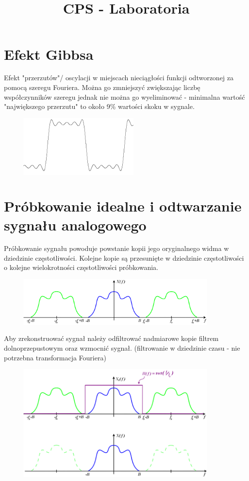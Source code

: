 \documentclass[11pt]{article}
\title{CPS - Laboratoria}
\begin{document}
\maketitle

\section{Efekt Gibbsa}
Efekt "przerzutów"/ oscylacji w miejscach nieciągłości funkcji odtworzonej za pomocą szeregu Fouriera. Można go zmniejszyć zwiększając liczbę współczynników szeregu jednak nie można go wyeliminować - minimalna wartość "największego przerzutu" to około 9\% wartości skoku w sygnale. 

\begin{figure}[h]
    \centering
    \includegraphics[width=6cm]{gibbs.png}
\end{figure}

\section{Próbkowanie idealne i odtwarzanie sygnału analogowego}
Próbkowanie sygnału powoduje powstanie kopii jego oryginalnego widma w dziedzinie częstotliwości. Kolejne kopie są przesunięte w dziedzinie częstotliwości o kolejne wielokrotności częstotliwości próbkowania.
\begin{figure}[h]
    \centering
    \includegraphics[width=10cm]{sampling.png}
\end{figure}


Aby zrekonstruować sygnał należy odfiltrować nadmiarowe kopie filtrem dolnoprzepustowym oraz wzmocnić sygnał. (filtrowanie w dziedzinie czasu - nie potrzebna transformacja Fouriera)
\begin{figure}[h]
    \centering
    \includegraphics[width=10cm]{sampling2.png}
\end{figure}
\end{document}

